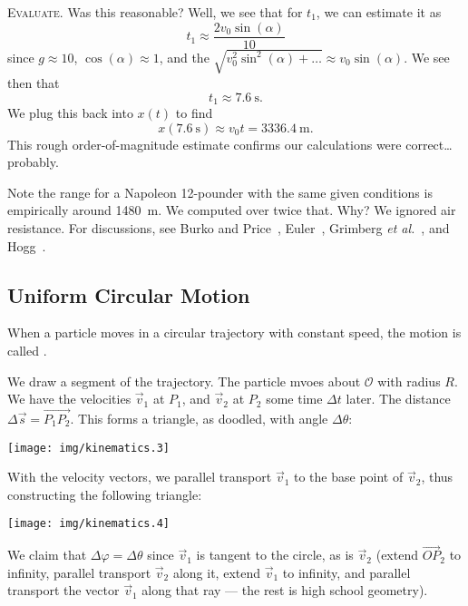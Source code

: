 \begin{soln}
\textsc{Evaluate.} Was this reasonable? Well, we see that for $t_{1}$,
we can estimate it as
\begin{equation}
t_{1}\approx \frac{2v_{0}\sin(\alpha)}{10}
\end{equation}
since $g\approx 10$, $\cos(\alpha)\approx 1$, and the
$\sqrt{v_{0}^{2}\sin^{2}(\alpha)+\dots}\approx 
v_{0}\sin(\alpha)$. We see then that
\begin{equation}
t_{1}\approx \SI{7.6}{\second}.
\end{equation}
We plug this back into $x(t)$ to find
\begin{equation}
x(\SI{7.6}{\second})\approx v_{0}t = \SI{3336.4}{\meter}.
\end{equation}
This rough order-of-magnitude estimate confirms our calculations were
correct\dots probably.
\end{soln}

\begin{remark}
Note the range for a Napoleon 12-pounder with the same given conditions
is empirically around \SI{1480}{\meter}. We computed over twice
that. Why? We ignored air resistance. For discussions, see
Burko and Price~\cite{burko2003}, Euler~\cite{e77,e217,e226,e853}, 
Grimberg \emph{et al.}~\cite{grimberg2008}, and Hogg~\cite{hogg2007}. 
\end{remark}

\subsection{Uniform Circular Motion}

When a particle moves in a circular trajectory with constant speed, the
motion is called .

\label{M:kinematics:uniform-circular-motion:derivation-of-acceleration}
We draw a segment of the trajectory. The particle mvoes about
$\mathcal{O}$ with radius $R$. We have the velocities $\vec{v}_{1}$ at
$P_{1}$, and $\vec{v}_{2}$ at $P_{2}$ some time $\Delta t$ later. The
distance $\Delta\vec{s}=\overrightarrow{P_{1}P_{2}}$. This forms a triangle, as
doodled, with angle $\Delta\theta$:
\begin{center}
\texttt{[image: img/kinematics.3]}
\end{center}
With the velocity vectors, we parallel transport $\vec{v}_{1}$ to the
base point of $\vec{v}_{2}$, thus constructing the following triangle:
\begin{center}
\texttt{[image: img/kinematics.4]}
\end{center}
We claim that $\Delta\varphi=\Delta\theta$ since $\vec{v}_{1}$ is
tangent to the circle, as is $\vec{v}_{2}$ (extend
$\overrightarrow{OP}_{2}$ to infinity, parallel transport $\vec{v}_{2}$
along it, extend $\vec{v}_{1}$ to infinity, and parallel transport the
vector $\vec{v}_{1}$ along that ray --- the rest is high school geometry).

